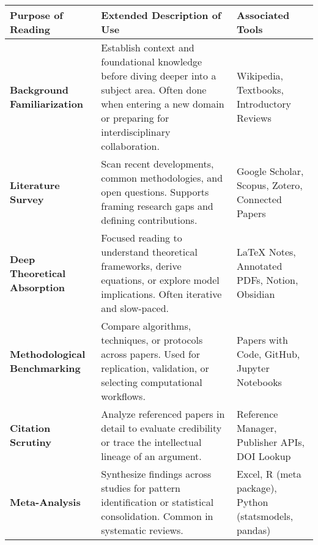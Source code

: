 \documentclass[border=10pt]{standalone}
\begin{document}
\begin{adjustbox}{max width=\textwidth}
\begin{tabular}{>{\bfseries}m{3.5cm} m{7.5cm} m{4cm}}
\toprule
Purpose of Reading & Extended Description of Use & Associated Tools \\
\midrule
Background Familiarization & Establish context and foundational knowledge before diving deeper into a subject area. Often done when entering a new domain or preparing for interdisciplinary collaboration. & Wikipedia, Textbooks, Introductory Reviews \\
\addlinespace
Literature Survey & Scan recent developments, common methodologies, and open questions. Supports framing research gaps and defining contributions. & Google Scholar, Scopus, Zotero, Connected Papers \\
\addlinespace
Deep Theoretical Absorption & Focused reading to understand theoretical frameworks, derive equations, or explore model implications. Often iterative and slow-paced. & LaTeX Notes, Annotated PDFs, Notion, Obsidian \\
\addlinespace
Methodological Benchmarking & Compare algorithms, techniques, or protocols across papers. Used for replication, validation, or selecting computational workflows. & Papers with Code, GitHub, Jupyter Notebooks \\
\addlinespace
Citation Scrutiny & Analyze referenced papers in detail to evaluate credibility or trace the intellectual lineage of an argument. & Reference Manager, Publisher APIs, DOI Lookup \\
\addlinespace
Meta-Analysis & Synthesize findings across studies for pattern identification or statistical consolidation. Common in systematic reviews. & Excel, R (meta package), Python (statsmodels, pandas) \\
\bottomrule
\end{tabular}
\end{adjustbox}
\end{document}
